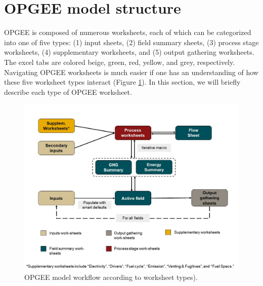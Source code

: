 \documentclass[11pt]{report}
\newcommand{\sheet}[1]{\textit{`{#1}'}}
\begin{document}
%
%
%
%

\section{OPGEE model structure}
\label{sec:model_structure}

OPGEE is composed of numerous worksheets, each of which can be categorized into one of five types: (1) input sheets, (2) field summary sheets, (3) process stage worksheets, (4) supplementary worksheets, and (5) output gathering worksheets. The excel tabs are colored beige, green, red, yellow, and grey, respectively. Navigating OPGEE worksheets is much easier if one has an understanding of how these five worksheet types interact (Figure \ref{fig:model_structure}). In this section, we will briefly describe each type of OPGEE worksheet.

\begin{landscape}
\begin{figure}[ht]
\includegraphics[width=1\columnwidth]{images/Fig_3.jpg}
\caption{OPGEE model workflow according to worksheet types).}
\label{fig:model_structure}
\end{figure}
\end{landscape}
\end{document}
